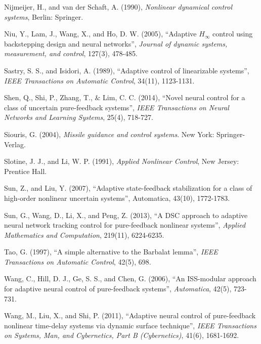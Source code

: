 \documentclass{tSYS2e}
\theoremstyle{plain}
\theoremstyle{definition}
\begin{document}
\begin{thebibliography}{99}
 Nijmeijer, H., and van
der Schaft, A. (1990), {\itshape  Nonlinear dynamical control systems}, Berlin: Springer.

 Niu, Y., Lam, J., Wang, X., and Ho, D. W. (2005),
``Adaptive $H_{\infty}$ control using backstepping design and neural networks'',
{\itshape Journal of dynamic systems, measurement, and control}, 127(3), 478-485.

 Sastry, S. S., and Isidori,
A. (1989), ``Adaptive control of linearizable systems'', {\itshape IEEE Transactions on
Automatic Control}, 34(11), 1123-1131.

 Shen, Q., Shi, P., Zhang, T., $
\&$ Lim, C. C. (2014), ``Novel neural control for a class of uncertain
pure-feedback systems'', {\itshape IEEE
Transactions on Neural Networks and Learning Systems}, 25(4), 718-727.

 Siouris, G. (2004), {\itshape Missile guidance and control
systems}. New York: Springer-Verlag.

 Slotine, J. J., and Li, W.
P. (1991), {\itshape Applied Nonlinear Control}, New Jersey: Prentice Hall.

 Sun, Z., and Liu, Y. (2007),
``Adaptive state-feedback stabilization for a class of high-order nonlinear uncertain systems'', Automatica, 43(10), 1772-1783.

 Sun, G., Wang, D., Li, X., and
Peng, Z. (2013), ``A DSC approach to adaptive neural network tracking control
for pure-feedback nonlinear systems'', {\itshape Applied Mathematics and Computation},
219(11), 6224-6235.

  Tao, G. (1997),
``A simple alternative to the Barbalat lemma'', {\itshape IEEE Transactions on Automatic Control}, 42(5), 698.

 Wang, C., Hill, D. J., Ge, S.
S., and Chen, G. (2006), ``An ISS-modular approach for adaptive neural control
of pure-feedback systems'', {\itshape Automatica}, 42(5), 723-731.

Wang, M., Liu, X., and Shi, P. (2011), ``Adaptive neural control of pure-feedback nonlinear time-delay systems via dynamic surface technique'', {\itshape IEEE Transactions on Systems, Man, and Cybernetics, Part B (Cybernetics)}, 41(6), 1681-1692.


\end{thebibliography}
\end{document}
